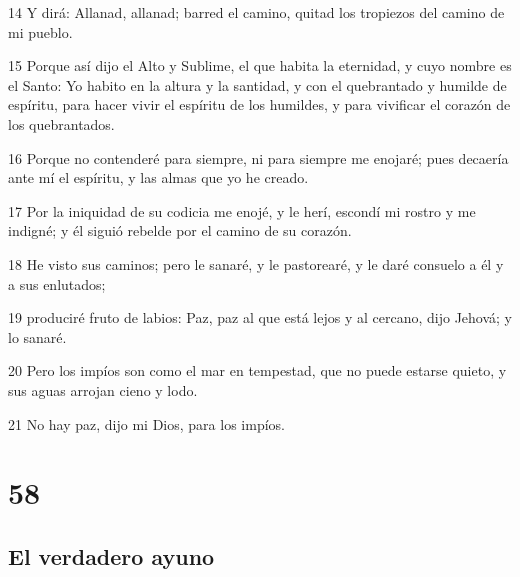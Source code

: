 \par 14 Y dirá: Allanad, allanad; barred el camino, quitad los tropiezos del camino de mi pueblo.
\par 15 Porque así dijo el Alto y Sublime, el que habita la eternidad, y cuyo nombre es el Santo: Yo habito en la altura y la santidad, y con el quebrantado y humilde de espíritu, para hacer vivir el espíritu de los humildes, y para vivificar el corazón de los quebrantados.
\par 16 Porque no contenderé para siempre, ni para siempre me enojaré; pues decaería ante mí el espíritu, y las almas que yo he creado.
\par 17 Por la iniquidad de su codicia me enojé, y le herí, escondí mi rostro y me indigné; y él siguió rebelde por el camino de su corazón.
\par 18 He visto sus caminos; pero le sanaré, y le pastorearé, y le daré consuelo a él y a sus enlutados;
\par 19 produciré fruto de labios: Paz, paz al que está lejos y al cercano, dijo Jehová; y lo sanaré.
\par 20 Pero los impíos son como el mar en tempestad, que no puede estarse quieto, y sus aguas arrojan cieno y lodo.
\par 21 No hay paz, dijo mi Dios, para los impíos. 

\chapter{58}

\section*{El verdadero ayuno}


